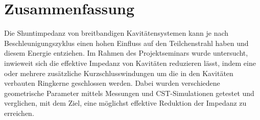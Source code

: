 \chapter*{Zusammenfassung}
Die Shuntimpedanz von breitbandigen Kavitätensystemen kann je nach Beschleunigungszyklus einen hohen Einfluss auf den Teilchenstrahl haben und diesem Energie entziehen. Im Rahmen des Projektseminars wurde untersucht, inwieweit sich die effektive Impedanz von Kavitäten reduzieren lässt, indem eine oder mehrere zusätzliche Kurzschlusswindungen um die in den Kavitäten verbauten Ringkerne geschlossen werden. Dabei wurden verschiedene geometrische Parameter mittels Messungen und CST-Simulationen getestet und verglichen, mit dem Ziel, eine möglichst effektive Reduktion der Impedanz zu erreichen.